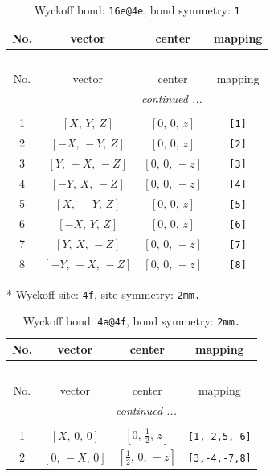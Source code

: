 \documentclass[fleqn,8pt]{jsarticle}
\begin{document}
\begin{longtable}{cccc}
\caption{Wyckoff bond: {\tt 16e@4e}, bond symmetry: {\tt 1}}
 \\
 \hline \hline
No. & vector & center & mapping \\ \hline \endfirsthead

\multicolumn{3}{l}{\tablename\ \thetable{}} \\
 \hline \hline
No. & vector & center & mapping \\ \hline \endhead

 \hline \hline
\multicolumn{3}{r}{\footnotesize\it continued ...} \\ \endfoot

 \hline \hline
\multicolumn{3}{r}{} \\ \endlastfoot

1 & $\left[ X,\, Y,\, Z \right]$ & $\left[ 0,\, 0,\, z \right]$ & {\tt [1]} \\ \hline
2 & $\left[ - X,\, - Y,\, Z \right]$ & $\left[ 0,\, 0,\, z \right]$ & {\tt [2]} \\ \hline
3 & $\left[ Y,\, - X,\, - Z \right]$ & $\left[ 0,\, 0,\, - z \right]$ & {\tt [3]} \\ \hline
4 & $\left[ - Y,\, X,\, - Z \right]$ & $\left[ 0,\, 0,\, - z \right]$ & {\tt [4]} \\ \hline
5 & $\left[ X,\, - Y,\, Z \right]$ & $\left[ 0,\, 0,\, z \right]$ & {\tt [5]} \\ \hline
6 & $\left[ - X,\, Y,\, Z \right]$ & $\left[ 0,\, 0,\, z \right]$ & {\tt [6]} \\ \hline
7 & $\left[ Y,\, X,\, - Z \right]$ & $\left[ 0,\, 0,\, - z \right]$ & {\tt [7]} \\ \hline
8 & $\left[ - Y,\, - X,\, - Z \right]$ & $\left[ 0,\, 0,\, - z \right]$ & {\tt [8]} \\
\end{longtable}
* Wyckoff site: {\tt 4f}, site symmetry: {\tt 2mm.}
\renewcommand{\arraystretch}{1.2}
\begin{longtable}{cccc}
\caption{Wyckoff bond: {\tt 4a@4f}, bond symmetry: {\tt 2mm.}}
 \\
 \hline \hline
No. & vector & center & mapping \\ \hline \endfirsthead

\multicolumn{3}{l}{\tablename\ \thetable{}} \\
 \hline \hline
No. & vector & center & mapping \\ \hline \endhead

 \hline \hline
\multicolumn{3}{r}{\footnotesize\it continued ...} \\ \endfoot

 \hline \hline
\multicolumn{3}{r}{} \\ \endlastfoot

1 & $\left[ X,\, 0,\, 0 \right]$ & $\left[ 0,\, \frac{1}{2},\, z \right]$ & {\tt [1,-2,5,-6]} \\ \hline
2 & $\left[ 0,\, - X,\, 0 \right]$ & $\left[ \frac{1}{2},\, 0,\, - z \right]$ & {\tt [3,-4,-7,8]} \\
\end{longtable}
\end{document}
